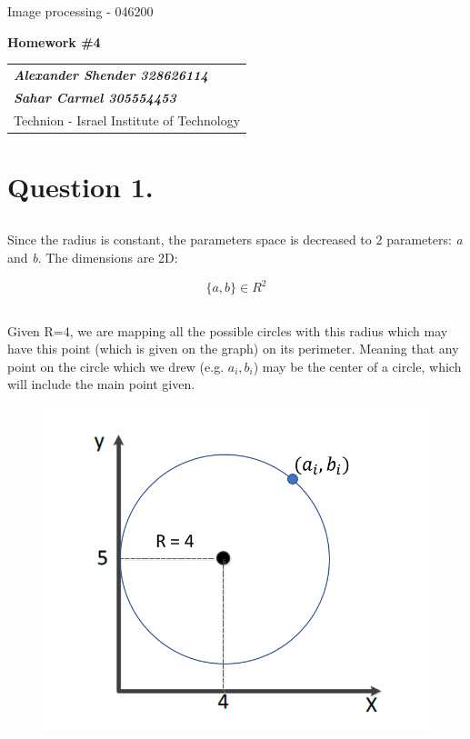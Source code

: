 \documentclass[a4paper]{iacas}
\begin{document}
\begin{center}
 \large Image processing - 046200
 \end{center}
\begin{center}
\large\textbf{Homework \#4}
 \end{center}


\begin{tabular}{l}
\\
{\bf\textit{Alexander Shender 328626114}} \\
{\bf\textit{Sahar Carmel 305554453}} \\
Technion - Israel Institute of Technology
\end{tabular}


\newpage
\section{Question 1.}
\subsection{}
Since the radius is constant, the parameters space is decreased to 2 parameters: \textit{a} and \textit{b}. The dimensions are 2D:

\begin{equation*}
\{a,b\} \in R^{2}
\end{equation*}
\subsection{}
Given R=4, we are mapping all the possible circles with this radius which may have this point (which is given on the graph) on its perimeter. Meaning that any point on the circle which we drew (e.g. $a_{i}, b_{i}$) may be the center of a circle, which will include the main point given.

\begin{figure}[h!]
\includegraphics[scale=0.7]{imgs/q1_1.png}
\end{figure}
\end{document}
